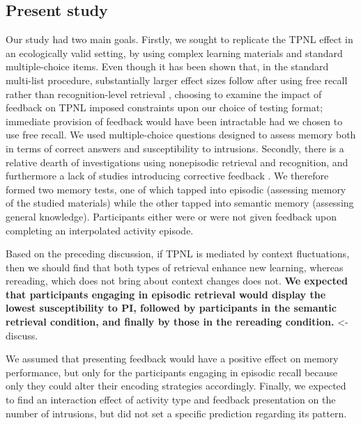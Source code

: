 \documentclass[../main.tex]{subfiles}
\begin{document}
\subsection{Present study\label{present}}

Our study had two main goals. Firstly, we sought to replicate the TPNL 
effect in an ecologically valid setting, by using complex learning materials 
and standard multiple-choice items. Even though it has been shown that, in 
the standard multi-list procedure, substantially larger effect sizes follow 
after using free recall rather than recognition-level retrieval 
 \citep{chanRetrievalPotentiatesNew2018}, choosing to examine the impact of 
feedback on TPNL imposed constraints upon our choice of testing format; 
immediate provision of feedback would have been intractable had we chosen 
to use free recall. We used multiple-choice questions designed to assess 
memory both in terms of correct answers and susceptibility to intrusions. 
Secondly, there is a relative dearth of investigations using nonepisodic  
retrieval and recognition, and furthermore a lack of studies introducing 
corrective feedback \citep{chanRetrievalPotentiatesNew2018}. We therefore 
formed two memory tests, one of which tapped into episodic (assessing memory 
of the studied materials) while the other tapped into semantic memory 
(assessing general knowledge). Participants either were or were not given 
feedback upon completing an interpolated activity episode.

Based on the preceding discussion, if TPNL is mediated by context 
fluctuations, then we should find that both types of retrieval enhance new 
learning, whereas rereading, which does not bring about context changes 
\citep{chanRetrievalPotentiatesNew2018} does not. \textbf{We expected that 
participants engaging in episodic retrieval would display the lowest 
susceptibility to PI, followed by participants in the semantic retrieval 
condition, and finally by those in the rereading condition.} <- discuss.

We assumed that 
presenting feedback would have a positive effect on memory performance, but 
only for the participants engaging in episodic recall because only they 
could alter their encoding strategies accordingly. Finally, we expected to 
find an interaction effect of activity type and feedback presentation on the 
number of intrusions, but did not set a specific prediction regarding its 
pattern.
 
{
	\biblio
}
\end{document}
